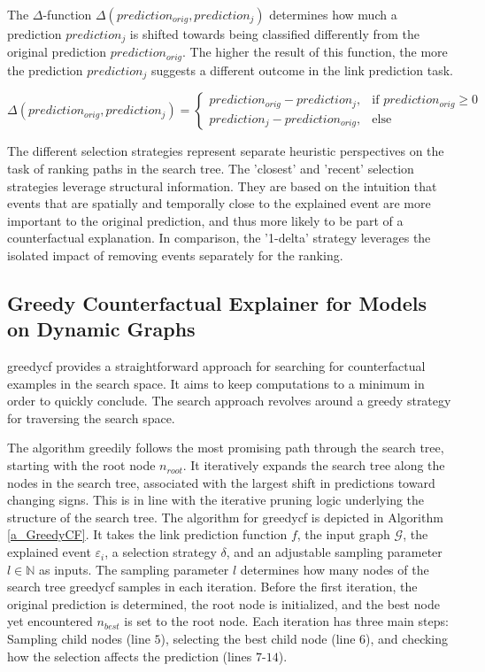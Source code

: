 The $\Delta$-function $\Delta(prediction_{orig}, prediction_j)$ determines how much a prediction $prediction_j$ is shifted towards being classified differently from the original prediction $prediction_{orig}$. The higher the result of this function, the more the prediction $prediction_j$ suggests a different outcome in the link prediction task.

\begin{equation}
    \Delta(prediction_{orig}, prediction_j) = 
    \begin{cases}
        prediction_{orig} - prediction_j,  &\text{if } prediction_{orig} \geq 0 \\
        prediction_j - prediction_{orig},  &\text{else}
    \end{cases}
\end{equation}


The different selection strategies represent separate heuristic perspectives on the task of ranking paths in the search tree. The 'closest' and 'recent' selection strategies leverage structural information. They are based on the intuition that events that are spatially and temporally close to the explained event are more important to the original prediction, and thus more likely to be part of a counterfactual explanation. In comparison, the '1-delta' strategy leverages the isolated impact of removing events separately for the ranking.  


\subsection{Greedy Counterfactual Explainer for Models on Dynamic Graphs}
\label{s_Methodology_GreedyCF}

\acrfull{greedycf} provides a straightforward approach for searching for counterfactual examples in the search space. It aims to keep computations to a minimum in order to quickly conclude. The search approach revolves around a greedy strategy for traversing the search space.

The algorithm greedily follows the most promising path through the search tree, starting with the root node $n_{root}$. It iteratively expands the search tree along the nodes in the search tree, associated with the largest shift in predictions toward changing signs. This is in line with the iterative pruning logic underlying the structure of the search tree. The algorithm for \gls{greedycf} is depicted in Algorithm \ref{a_GreedyCF}. It takes the link prediction function $f$, the input graph $\mathcal{G}$, the explained event $\varepsilon_i$, a selection strategy $\delta$, and an adjustable sampling parameter $l \in \mathbb{N}$ as inputs. The sampling parameter $l$ determines how many nodes of the search tree \gls{greedycf} samples in each iteration. Before the first iteration, the original prediction is determined, the root node is initialized, and the best node yet encountered $n_{best}$ is set to the root node. Each iteration has three main steps: Sampling child nodes (line $5$), selecting the best child node (line $6$), and checking how the selection affects the prediction (lines $7$-$14$). 

